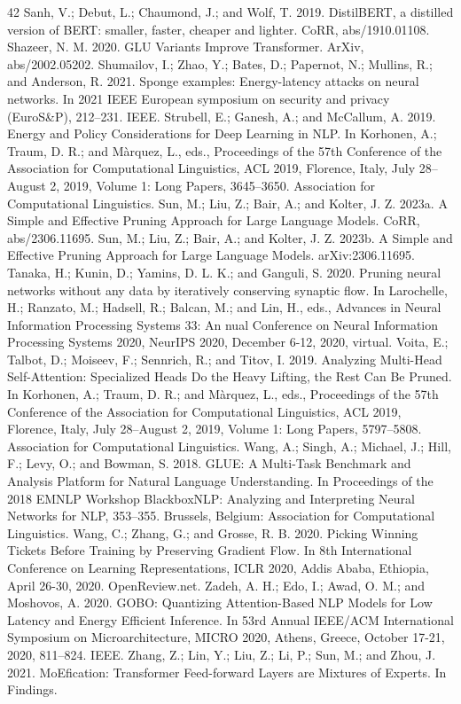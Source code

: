 \documentclass[11pt,a4paper]{article}
\begin{document}
\begin{thebibliography}{42}
 Sanh, V.; Debut, L.; Chaumond, J.; and Wolf, T. 2019. DistilBERT, a distilled version of BERT: smaller, faster, cheaper and lighter. CoRR, abs/1910.01108.
 Shazeer, N. M. 2020. GLU Variants Improve Transformer. ArXiv, abs/2002.05202.
 Shumailov, I.; Zhao, Y.; Bates, D.; Papernot, N.; Mullins, R.; and Anderson, R. 2021. Sponge examples: Energy-latency attacks on neural networks. In 2021 IEEE European symposium on security and privacy (EuroS\&P), 212–231. IEEE.
 Strubell, E.; Ganesh, A.; and McCallum, A. 2019. Energy and Policy Considerations for Deep Learning in NLP. In Korhonen, A.; Traum, D. R.; and Màrquez, L., eds., Proceedings of the 57th Conference of the Association for Computational Linguistics, ACL 2019, Florence, Italy, July 28–August 2, 2019, Volume 1: Long Papers, 3645–3650. Association for Computational Linguistics.
 Sun, M.; Liu, Z.; Bair, A.; and Kolter, J. Z. 2023a. A Simple and Effective Pruning Approach for Large Language Models. CoRR, abs/2306.11695.
 Sun, M.; Liu, Z.; Bair, A.; and Kolter, J. Z. 2023b. A Simple and Effective Pruning Approach for Large Language Models. arXiv:2306.11695.
 Tanaka, H.; Kunin, D.; Yamins, D. L. K.; and Ganguli, S. 2020. Pruning neural networks without any data by iteratively conserving synaptic flow. In Larochelle, H.; Ranzato, M.; Hadsell, R.; Balcan, M.; and Lin, H., eds., Advances in Neural Information Processing Systems 33: An
 nual Conference on Neural Information Processing Systems 2020, NeurIPS 2020, December 6-12, 2020, virtual.
 Voita, E.; Talbot, D.; Moiseev, F.; Sennrich, R.; and Titov, I. 2019. Analyzing Multi-Head Self-Attention: Specialized Heads Do the Heavy Lifting, the Rest Can Be Pruned. In Korhonen, A.; Traum, D. R.; and Màrquez, L., eds., Proceedings of the 57th Conference of the Association for Computational Linguistics, ACL 2019, Florence, Italy, July 28–August 2, 2019, Volume 1: Long Papers, 5797–5808. Association for Computational Linguistics.
 Wang, A.; Singh, A.; Michael, J.; Hill, F.; Levy, O.; and Bowman, S. 2018. GLUE: A Multi-Task Benchmark and Analysis Platform for Natural Language Understanding. In Proceedings of the 2018 EMNLP Workshop BlackboxNLP: Analyzing and Interpreting Neural Networks for NLP, 353–355. Brussels, Belgium: Association for Computational Linguistics.
 Wang, C.; Zhang, G.; and Grosse, R. B. 2020. Picking Winning Tickets Before Training by Preserving Gradient Flow. In 8th International Conference on Learning Representations, ICLR 2020, Addis Ababa, Ethiopia, April 26-30, 2020. OpenReview.net.
 Zadeh, A. H.; Edo, I.; Awad, O. M.; and Moshovos, A. 2020. GOBO: Quantizing Attention-Based NLP Models for Low Latency and Energy Efficient Inference. In 53rd Annual IEEE/ACM International Symposium on Microarchitecture, MICRO 2020, Athens, Greece, October 17-21, 2020, 811–824. IEEE.
 Zhang, Z.; Lin, Y.; Liu, Z.; Li, P.; Sun, M.; and Zhou, J. 2021. MoEfication: Transformer Feed-forward Layers are Mixtures of Experts. In Findings.
\end{thebibliography}
\end{document}
